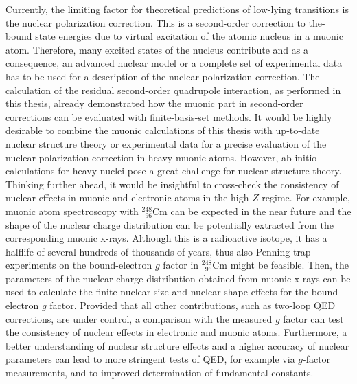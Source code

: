 Currently, the limiting factor for theoretical predictions of low-lying transitions is the nuclear polarization correction. This is a second-order correction to the-bound state energies due to virtual excitation of the atomic nucleus in a muonic atom. Therefore, many excited states of the nucleus contribute and as a consequence, an advanced nuclear model or a complete set of experimental data has to be used for a description of the nuclear polarization correction.
The calculation of the residual second-order quadrupole interaction, as performed in this thesis, already demonstrated how the muonic part in second-order corrections can be evaluated with finite-basis-set methods. It would be highly desirable to combine the muonic calculations of this thesis with up-to-date nuclear structure theory or experimental data for a precise evaluation of the nuclear polarization correction in heavy muonic atoms. However, ab initio calculations for heavy nuclei pose a great challenge for nuclear structure theory.\\[11pt]%
%
Thinking further ahead, it would be insightful to cross-check the consistency of nuclear effects in muonic and electronic atoms in the high-$Z$ regime. 
For example, muonic atom spectroscopy with $_{\phantom{1}96}^{248}$Cm can be expected in the near future and the shape of the nuclear charge distribution can be potentially extracted from the corresponding muonic x-rays. Although this is a radioactive isotope, it has a halflife of several hundreds of thousands of years, thus also Penning trap experiments on the bound-electron $g$ factor in $_{\phantom{1}96}^{248}$Cm might be feasible. Then, the parameters of the nuclear charge distribution obtained from muonic x-rays can be used to calculate the finite nuclear size and nuclear shape effects for the bound-electron $g$ factor. Provided that all other contributions, such as two-loop QED corrections, are under control, a comparison with the measured $g$ factor can test the consistency of nuclear effects in electronic and muonic atoms. 
Furthermore, a better understanding of nuclear structure effects and a higher accuracy of nuclear parameters can lead to more stringent tests of QED, for example via $g$-factor measurements, and to improved determination of fundamental constants.

